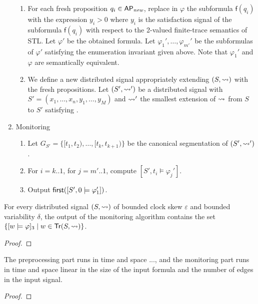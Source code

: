 \begin{enumerate}
\begin{enumerate}[label=\arabic*.]
		\item
		For each fresh proposition $q_i \in \mathsf{AP}_{\textit{new}}$, replace in $\varphi$ the subformula $\mathsf{f}(q_i)$ with the expression $y_i > 0$ where $y_i$ is the satisfaction signal of the subformula $\mathsf{f}(q_i)$ \alert{with respect to the 2-valued finite-trace semantics of STL}. 
		Let $\varphi'$ be the obtained formula.
		Let $\varphi_1', \ldots, \varphi_{m'}'$ be the subformulas of $\varphi'$ satisfying the enumeration invariant given above.
		Note that $\varphi_1'$  and $\varphi$ are semantically equivalent. %
		
		\item
		We define a new distributed signal appropriately extending $(S,{\rightsquigarrow})$ with the fresh propositions.
		Let $(S', {\rightsquigarrow}')$ be a distributed signal with $S' = (x_1, \ldots, x_n, y_1, \ldots, y_M)$ and ${\rightsquigarrow}'$ the smallest extension of ${\rightsquigarrow}$ from $S$ to $S'$ satisfying . 
		
	\end{enumerate}

	\item Monitoring
	\begin{enumerate}[label=\arabic*.]
		\item
		Let $G_{S'} = \{ [t_1, t_2), \ldots, [t_k, t_{k+1}) \}$ be the canonical segmentation of $(S', {\rightsquigarrow}')$.
		
		\item
		For $i = k .. 1$, for $j = m' .. 1$, compute $[S', t_i \models \varphi_j']$.
		
		\item
		Output \alert{$\textsf{first}([S',0 \models \varphi_1'])$}.
	\end{enumerate}
\end{enumerate}

\begin{example}
	\TODO
\end{example}

\begin{claim}
	For every distributed signal $(S, {\rightsquigarrow})$ of bounded clock skew $\varepsilon$ and bounded variability $\delta$, the output of the monitoring algorithm contains the set $\{ [w \models \varphi]_3 \st w \in \tr(S, {\hb}) \}$.
\end{claim}
\begin{proof}
	\TODO
\end{proof}

\begin{claim}
	The preprocessing part runs in time and space ..., and the monitoring part runs in time and space linear in the size of the input formula and the number of edges in the input signal. 
\end{claim}
\begin{proof}
	\TODO
\end{proof}